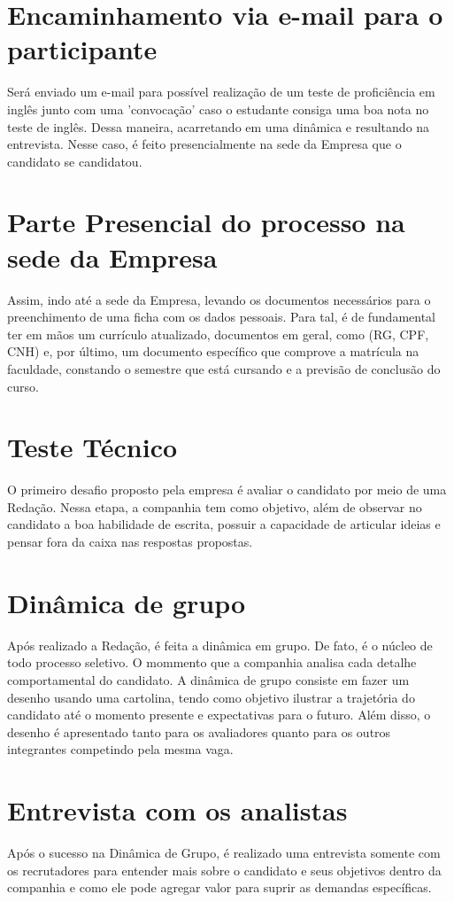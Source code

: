 \section{Encaminhamento via e-mail para o participante}
Será enviado um e-mail para possível realização de um teste de proficiência em inglês junto com uma 'convocação' caso o estudante consiga uma boa nota no teste de inglês. Dessa maneira, acarretando em uma dinâmica e resultando na entrevista. Nesse caso, é feito presencialmente na sede da Empresa que o candidato se candidatou.

\section{ Parte Presencial do processo na sede da Empresa}
Assim, indo até a sede da Empresa, levando os documentos necessários para o preenchimento de uma ficha com os dados pessoais. Para tal, é de fundamental ter em mãos um currículo atualizado, documentos em geral, como (RG, CPF, CNH) e, por último, um documento específico que comprove a matrícula na faculdade, constando o semestre que está cursando e a previsão de conclusão do curso.

\section{ Teste Técnico}
O primeiro desafio proposto pela empresa é avaliar o candidato por meio de uma Redação. Nessa etapa, a companhia tem como objetivo, além de observar no candidato a boa habilidade de escrita, possuir a  capacidade de articular ideias e pensar fora da caixa nas respostas propostas.

\section{ Dinâmica de grupo}
Após realizado a Redação, é feita a dinâmica em grupo. De fato, é o núcleo de todo processo seletivo. O mommento que a companhia analisa cada detalhe comportamental do candidato.
A dinâmica de grupo consiste em fazer um desenho usando uma cartolina, tendo como objetivo ilustrar a trajetória do candidato até o momento presente e expectativas para o futuro. Além disso, o desenho é apresentado tanto para os avaliadores quanto para os outros integrantes competindo pela mesma vaga.

\section{ Entrevista com os analistas}
Após o sucesso na Dinâmica de Grupo, é realizado uma entrevista somente com os recrutadores para entender mais sobre o candidato e seus objetivos dentro da companhia e como ele pode agregar valor para suprir as demandas específicas.

